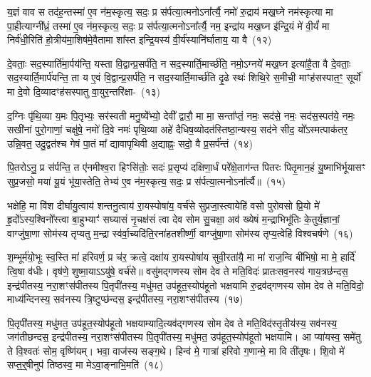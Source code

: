 य॒ज्ञं वाव स तद॑ह॒न्तस्मा॑ ए॒व न॑म॒स्कृत्य॒ सदः॒ प्र स॑र्पत्या॒त्मनो\-ऽना᳚र्त्यै॒ नमो॑ रु॒द्राय॑ मख॒घ्ने नम॑स्कृत्या मा पा॒हीत्याग्नी᳚ध्रं॒ तस्मा॑ ए॒व न॑म॒स्कृत्य॒ सदः॒ प्र स॑र्पत्या॒त्मनो\-ऽना᳚र्त्यै॒ नम॒ इन्द्रा॑य मख॒घ्न इ॑न्द्रि॒यं मे॑ वी॒र्यं॑ मा निर्व॑धी॒रिति॑ हो॒त्रीय॑मा॒शिष॑मे॒वैतामा शा᳚स्त इन्द्रि॒यस्य॑ वी॒र्य॑स्यानि॑र्घाताय॒ या वै~(१२)

दे॒वताः॒ सद॒स्यार्ति॑मा॒र्पय॑न्ति॒ यस्ता वि॒द्वान्प्र॒सर्प॑ति॒ न सद॒स्यार्ति॒मार्च्छ॑ति॒ नमो॒\-ऽग्नये॑ मख॒घ्न इत्या॑है॒ता वै दे॒वताः॒ सद॒स्यार्ति॒मार्प॑यन्ति॒ ता य ए॒वं वि॒द्वान्प्र॒सर्प॑ति॒ न सद॒स्यार्ति॒मार्च्छ॑ति दृ॒ढे स्थः॑ शिथि॒रे स॒मीची॒ माꣳह॑सस्पात॒ꣳ॒ सूर्यो॑ मा दे॒वो दि॒व्यादꣳह॑सस्पातु वा॒युर॒न्तरि॑क्षा-~(१३)

द॒ग्निः पृ॑थि॒व्या य॒मः पि॒तृभ्यः॒ सर॑स्वती मनु॒ष्ये᳚भ्यो॒ देवी᳚ द्वारौ॒ मा मा॒ सन्ता᳚प्तं॒ नमः॒ सद॑से॒ नमः॒ सद॑स॒स्पत॑ये॒ नमः॒ सखी॑नां पुरो॒गाणां॒ चक्षु॑षे॒ नमो॑ दि॒वे नमः॑ पृथि॒व्या अहे॑ दैधिष॒व्योदत॑स्तिष्ठा॒न्यस्य॒ सद॑ने सीद॒ यो᳚\-ऽस्मत्पाक॑तर॒ उन्नि॒वत॒ उदु॒द्वत॑श्च गेषं पा॒तं मा᳚ द्यावा\-पृथिवी अ॒द्याह्नः॒ सदो॒ वै प्र॒सर्प॑न्तं~(१४)

पि॒तरो\-ऽनु॒ प्र स॑र्पन्ति॒ त ए॑नमीश्व॒रा हिꣳसि॑तोः॒ सदः॑ प्र॒सृप्य॑ दक्षिणा॒र्धं परे᳚क्षे॒ताग॑न्त पितरः पितृ॒मान॒हं यु॒ष्माभि॑र्भूयासꣳ सुप्र॒जसो॒ मया॑ यू॒यं भू॑या॒स्तेति॒ तेभ्य॑ ए॒व न॑म॒स्कृत्य॒ सदः॒ प्र स॑र्पत्या॒त्मनो\-ऽना᳚र्त्यै॥~(१५)

{\anuvakamend[{म॒खो वा अ॒न्तरि॑क्षात्प्र॒सर्प॑न्त॒न्त्रय॑स्त्रिꣳशच्च}]}%

भक्षेहि॒ मा वि॑श दीर्घायु॒त्वाय॑ शन्तनु॒त्वाय॑ रा॒यस्पोषा॑य॒ वर्च॑से सुप्रजा॒स्त्वायेहि॑ वसो पुरोवसो प्रि॒यो मे॑ हृ॒दो᳚\-ऽस्य॒श्विनो᳚स्त्वा बा॒हुभ्याꣳ॑ सघ्यासं नृ॒चक्ष॑सं त्वा देव सोम सु॒चक्षा॒ अव॑ ख्येषं म॒न्द्राभिभू॑तिः के॒तुर्य॒ज्ञानां॒ वाग्जु॑षा॒णा सोम॑स्य तृप्यतु म॒न्द्रा स्व॑र्वा॒च्यदि॑ति॒रना॑हतशीर्ष्णी॒ वाग्जु॑षा॒णा सोम॑स्य तृप्य॒त्वेहि॑ विश्वचर्\mbox{}षणे~(१६)

श॒म्भूर्म॑यो॒भूः स्व॒स्ति मा॑ हरिवर्ण॒ प्र च॑र॒ क्रत्वे॒ दक्षा॑य रा॒यस्पोषा॑य सुवी॒रता॑यै॒ मा मा॑ राज॒न्वि बी॑भिषो॒ मा मे॒ हार्दि॑ त्वि॒षा व॑धीः। वृष॑णे॒ शुष्मा॒या\-ऽऽ\-यु॑षे॒ वर्च॑से॥ वसु॑मद्गणस्य सोम देव ते मति॒विदः॑ प्रातःसव॒नस्य॑ गाय॒त्रछ॑न्दस॒ इन्द्र॑पीतस्य॒ नरा॒शꣳस॑पीतस्य पि॒तृपी॑तस्य॒ मधु॑मत॒ उप॑हूत॒स्योप॑हूतो भक्षयामि रु॒द्रव॑द्गणस्य सोम देव ते मति॒विदो॒ माध्य॑न्दिनस्य॒ सव॑नस्य त्रि॒ष्टुप्छ॑न्दस॒ इन्द्र॑पीतस्य॒ नरा॒शꣳस॑पीतस्य~(१७)

पि॒तृपी॑तस्य॒ मधु॑मत॒ उप॑हूत॒स्योप॑हूतो भक्षयाम्यादि॒त्यव॑द्गणस्य सोम देव ते मति॒विद॑स्तृ॒तीय॑स्य॒ सव॑नस्य॒ जग॑तीछन्दस॒ इन्द्र॑पीतस्य॒ नरा॒शꣳस॑पीतस्य पि॒तृपी॑तस्य॒ मधु॑मत॒ उप॑हूत॒स्योप॑हूतो भक्षयामि। आ प्या॑यस्व॒ समे॑तु ते वि॒श्वतः॑ सोम॒ वृष्णि॑यम्। भवा॒ वाज॑स्य सङ्ग॒थे। हिन्व॑ मे॒ गात्रा॑ हरिवो ग॒णान्मे॒ मा वि ती॑तृषः। शि॒वो मे॑ सप्त॒र्॒\mbox{}षीनुप॑ तिष्ठस्व॒ मा मे\-ऽवा॒ङ्नाभि॒मति॑~(१८)

